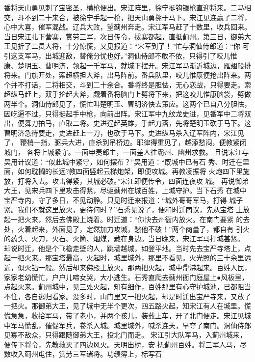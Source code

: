 番将天山勇见刺了宝密圣，横枪便出。宋江阵里，徐宁挺钩镰枪直迎将来。二马相
交，斗不到二十来合，被徐宁手起一枪，把天山勇搠于马下。宋江见连赢了二将，
心中大喜，催军混战。辽兵大败，望蓟州奔走。宋江军马赶了十数里，收兵回来。
当日宋江扎下营寨，赏劳三军，次日传令，拔寨都起，直抵蓟州。第三日，御弟大
王见折了二员大将，十分惊慌，又见报道：“宋军到了！”忙与洞仙侍郎道：“你
可引这支军马，出城迎敌，替俺分忧也好。”洞仙侍郎不敢不依，只得引了咬儿惟
康、楚明玉、曹明济，领起一千军马，就城下摆开。宋江军马渐近城边，雁翅般排
将来。门旗开处，索超横担大斧，出马阵前。番兵队里，咬儿惟康便抢出阵来。两
个并不打话，二将相交，斗到二十余合。番将终是胆怯，无心恋战，只得要走。索
超纵马赶上，双手抡起大斧，觑着番将脑门上劈将下来，把这咬儿惟康脑袋，劈做
两半个。洞仙侍郎见了，慌忙叫楚明玉、曹明济快去策应。这两个已自八分胆怯，
因吃逼不过，只得挺起手中枪，向前出阵。宋江军中九纹龙史进，见番军中二将双
出，便舞刀拍马，直取二将。史进逞起英雄，手起刀落，先将楚明玉砍于马下。这
曹明济急待要走，史进赶上一刀，也砍于马下。史进纵马杀入辽军阵内，宋江见了，
鞭梢一指，驱兵大进，直杀到吊桥边。耶律得重见了，越添愁闷，便教紧闭城门，
各将上城紧守。一面申奏郎主，一面差人往霸州、幽州求救。
且说宋江与吴用计议道：“似此城中紧守，如何摆布？”吴用道：“既城中已有石
秀、时迁在里面，如何耽搁的长远?教四面竖起云梯炮架，即便攻城。再教凌振将
火炮四下里施放，打将入去。攻击得紧，其城必破。”宋江即便传令，四面连夜攻
城。
再说御弟大王，见宋兵四下里攻击得紧，尽驱蓟州在城百姓，上城守护。当下石秀
在城中宝严寺内，守了多日，不见动静。只见时迁来报道：“城外哥哥军马，打得
城子紧。我们不就这里放火，更待何时？”石秀见说了，便和时迁商议，先从宝塔
上放起一把火来，然后去佛殿上烧着。时迁道：“你快去州衙内放火。在南门要紧
的去处，火着起来，外面见了，定然加力攻城，愁他不破！”两个商量了，都自有
引火的药头、火刀，火石、火筒、烟煤，藏在身边。当日晚来，宋江军马打城甚紧。
却说时迁，他是个飞檐走壁的人，跳墙越城，如登平地。当时先去宝严寺塔上，点
起一把火来。那宝塔最高，火起时，城里城外，那里不看见。火光照的三十余里远
近，似火钻一般。然后却来佛殿上放火。那两把火起，城中鼎沸起来。百姓人民，
家家老幼慌忙，户户儿啼女哭，大小逃生。石秀直爬去蓟州衙门庭屋上●风板里，
点起火来。蓟州城中，见三处火起，知有细作，百姓那里有心守护城池，已都阻当
不住，各自逃归看家。没多时，山门里又一把火起，却是时迁出宝严寺来，又放了
一把火。那御弟大王，见了城中无半个更次，四五路火起，知宋江有人在城里。慌
慌急急，收拾军马，带了老小，并两个孩儿，装载上车，开了北门便走。宋江见城
中军马慌乱，催促军兵，卷杀入城。城里城外，喊杀连天，早夺了南门。洞仙侍郎
见寡不敌众，只得跟随御弟大王，投北门而走。
宋江引大队军马，入蓟州城来，便传下将令，先教救灭了四边风火。天明出榜，安
抚蓟州百姓。将三军人马，尽数收入蓟州屯住，赏劳三军诸将。功绩簿上，标写石
